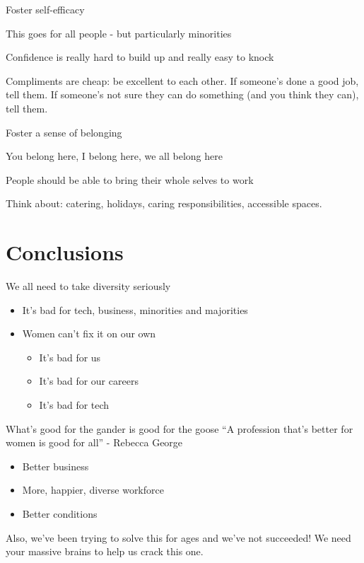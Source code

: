 \documentclass[xcolor=table,aspectratio=169]{beamer}
\begin{document}
\begin{frame}{Foster self-efficacy}

	This goes for all people - but particularly minorities

	\vspace{0.5em}

	Confidence is really hard to build up and really easy to knock

	\vspace{0.5em}

	Compliments are cheap: be excellent to each other. If someone's done a good job, tell them. If someone's not sure they can do something (and you think they can), tell them.

\end{frame}
\begin{frame}{Foster a sense of belonging}

	You belong here, I belong here, we all belong here 

	\vspace{0.5em}

	People should be able to bring their whole selves to work

	\vspace{0.5em}

Think about: catering, holidays, caring responsibilities, accessible spaces. 
\end{frame}


\section{Conclusions}
	\begin{frame}{We all need to take diversity seriously}
		\begin{itemize}
		\item It's bad for tech, business, minorities and majorities 
		\item Women can't fix it on our own
		\begin{itemize}
			\item It's bad for us
			\item It's bad for our careers
			\item It's bad for tech
		\end{itemize}
	\end{itemize}
	\end{frame}

\begin{frame}{What's good for the gander is good for the goose}
	``A profession that's better for women is good for all'' - Rebecca George 

	\begin{itemize}
		\item Better business
		\item More, happier, diverse workforce
		\item Better conditions
	\end{itemize}
	\vspace{0.5em}

	Also, we've been trying to solve this for ages and we've not succeeded! We need your massive brains to help us crack this one.

\end{frame}
\end{document}
